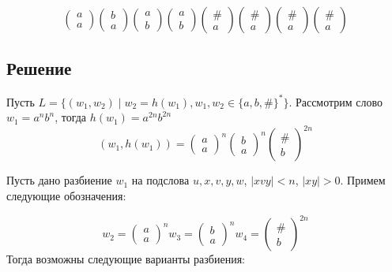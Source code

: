 \documentclass[a4paper, 14pt]{article}
\begin{document}
$$
\begin{pmatrix}
	a\\
	a
\end{pmatrix}
\begin{pmatrix}
	b\\
	a
\end{pmatrix}
\begin{pmatrix}
	a\\
	b	
\end{pmatrix}
\begin{pmatrix}
	a\\
	b	
\end{pmatrix}
\begin{pmatrix}
	\#\\
	a	
\end{pmatrix}
\begin{pmatrix}
	\#\\
	a	
\end{pmatrix}
\begin{pmatrix}
	\#\\
	a	
\end{pmatrix}
\begin{pmatrix}
	\#\\
	a	
\end{pmatrix}
$$

\subsection{Решение}

Пусть $L = \{(w_1, w_2) \mid w_2 = h(w_1), w_1, w_2 \in \{a, b, \# \}^{*}\}$. Рассмотрим слово $w_1 = a^{n}b^{n}$, тогда $h(w_1) = a^{2n}b^{2n}$
$$
(w_1, h(w_1)) = 
\begin{pmatrix}
	a\\
	a
\end{pmatrix}^n
\begin{pmatrix}
	b\\
	a
\end{pmatrix}^n
\begin{pmatrix}
	\# \\
	b	
\end{pmatrix}^{2n}
$$


Пусть дано разбиение $w_1$ на подслова $u, x, v, y, w$, $| xvy | < n$, $| xy | > 0$.
Примем следующие обозначения:

\[
	w_2 = 
	\begin{pmatrix}
	a\\
	a
	\end{pmatrix}^n
	w_3 = 
	\begin{pmatrix}
	b\\
	a
	\end{pmatrix}^n
	w_4 = 
	\begin{pmatrix}
	\# \\
	b	
	\end{pmatrix}^{2n}
\]
Тогда возможны следующие варианты разбиения:
\end{document}
